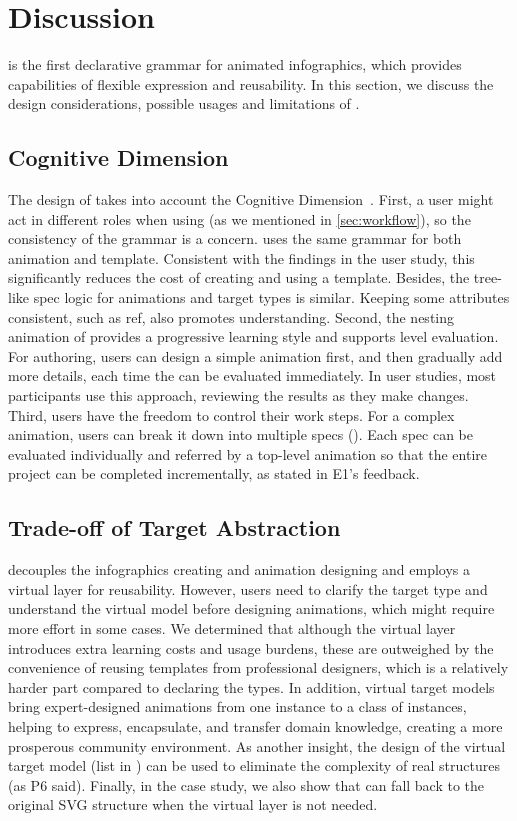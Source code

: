 \section{Discussion}
\label{sec:discuss}

\gaia{} is the first declarative grammar for animated infographics, which provides capabilities of flexible expression and reusability.
In this section, we discuss the design considerations, possible usages and limitations of \gaia{}.

\subsection{Cognitive Dimension}
The design of \gaia{} takes into account the Cognitive Dimension~\cite{blackwell2001cognitive}.
First, a user might act in different roles when using \gaia{} (as we mentioned in \autoref{sec:workflow}), so the consistency of the grammar is a concern.
\gaia{} uses the same grammar for both animation and template.
Consistent with the findings in the user study, this significantly reduces the cost of creating and using a template.
Besides, the tree-like spec logic for animations and target types is similar. 
Keeping some attributes consistent, such as ref, also promotes understanding.
Second, the nesting animation of \gaia{} provides a progressive learning style and supports \aniunit{} level evaluation. 
For \aniclass{} authoring, users can design a simple animation first, and then gradually add more details, each time the \aniunit{} can be evaluated immediately.
In user studies, most participants use this approach, reviewing the results as they make changes.
Third, users have the freedom to control their work steps. 
For a complex animation, users can break it down into multiple specs (\aniclass{}). 
Each spec can be evaluated individually and referred by a top-level animation so that the entire project can be completed incrementally, as stated in E1's feedback.

\subsection{Trade-off of Target Abstraction}
\gaia{} decouples the infographics creating and animation designing and employs a virtual layer for reusability.
However, users need to clarify the target type and understand the virtual model before designing animations, which might require more effort in some cases.
We determined that although the virtual layer introduces extra learning costs and usage burdens, these are outweighed by the convenience of reusing templates from professional designers, which is a relatively harder part compared to declaring the types.
In addition, virtual target models bring expert-designed animations from one instance to a class of instances, helping to express, encapsulate, and transfer domain knowledge, creating a more prosperous community environment.
As another insight, the design of the virtual target model (\eg list in \gaia{}) can be used to eliminate the complexity of real structures (as P6 said).
Finally, in the case study, we also show that \gaia{} can fall back to the original SVG structure when the virtual layer is not needed. 

